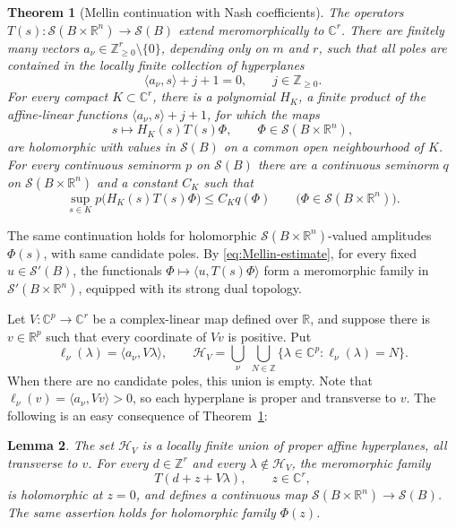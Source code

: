 \documentclass[a4paper,12pt]{amsart}
\numberwithin{equation}{section}
\newtheorem{theorem}{Theorem}[section]
\newtheorem{lemma}[theorem]{Lemma}
\theoremstyle{definition}
\theoremstyle{remark}
\newcommand{\R}{\mathbb R}
\newcommand{\C}{\mathbb C}
\newcommand{\mcS}{\mathcal S}
\begin{document}
\begin{theorem}[Mellin continuation with Nash coefficients]\label{thm:Nash-continuation}
The operators $T(s):\mcS(B\times\R^n)\to\mcS(B)$ extend meromorphically to $\C^r$. There are finitely many vectors $a_\nu\in\mathbb Z_{\ge0}^r\setminus\{0\}$, depending only on $m$ and $r$, such that all poles are contained in the locally finite collection of hyperplanes
\begin{equation}\label{eq:Nash-poles}
 \langle a_\nu,s\rangle+j+1=0,\qquad j\in\mathbb Z_{\ge0}.
\end{equation}
For every compact $K\subset\C^r$, there is a polynomial $H_K$, a finite product of the affine-linear functions $\langle a_\nu,s\rangle+j+1$, for which the maps
\[
 s\longmapsto H_K(s)T(s)\Phi,\qquad \Phi\in\mcS(B\times\R^n),
\]
are holomorphic with values in $\mcS(B)$ on a common open neighbourhood of $K$. For every continuous seminorm $p$ on $\mcS(B)$ there are a continuous seminorm $q$ on $\mcS(B\times\R^n)$ and a constant $C_K$ such that
\begin{equation}\label{eq:Mellin-estimate}
 \sup_{s\in K}p\bigl(H_K(s)T(s)\Phi\bigr)\le C_Kq(\Phi)
 \qquad\bigl(\Phi\in\mcS(B\times\R^n)\bigr).
\end{equation}
\end{theorem}

The same continuation holds for holomorphic $\mcS(B\times\R^n)$-valued amplitudes $\Phi(s)$, with same candidate poles. By \eqref{eq:Mellin-estimate}, for every fixed $u\in\mcS'(B)$, the functionals $\Phi\mapsto\langle u,T(s)\Phi\rangle$ form a meromorphic family in $\mcS'(B\times\R^n)$, equipped with its strong dual topology.

Let $V:\C^p\to\C^r$ be a complex-linear map defined over $\R$, and suppose there is $v\in\R^p$ such that every coordinate of $Vv$ is positive. Put
\[
 \ell_\nu(\lambda)=\langle a_\nu,V\lambda\rangle,
 \qquad
 \mathcal H_V=\bigcup_\nu\ \bigcup_{N\in\mathbb Z}
 \{\lambda\in\C^p:\ell_\nu(\lambda)=N\}.
\]
When there are no candidate poles, this union is empty.
Note that $\ell_\nu(v)=\langle a_\nu,Vv\rangle>0$, so each hyperplane is proper and transverse to $v$.
The following is an easy consequence of Theorem~\ref{thm:Nash-continuation}:

\begin{lemma}\label{lem:integer-shifts}
The set $\mathcal H_V$ is a locally finite union of proper affine hyperplanes, all transverse to $v$. For every $d\in\mathbb Z^r$ and every $\lambda\notin\mathcal H_V$, the meromorphic family
\[
 T(d+z+V\lambda),\qquad z\in\C^r,
\]
is holomorphic at $z=0$, and defines a continuous map $\mcS(B\times\R^n)\to\mcS(B)$. The same assertion holds for holomorphic family $\Phi(z)$.
\end{lemma}
\end{document}
